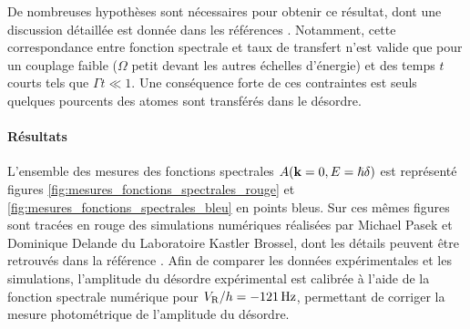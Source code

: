 De nombreuses hypothèses sont nécessaires pour obtenir ce résultat, dont une discussion détaillée est donnée dans les références \citep{denechaud2018vers}\citep{volchkov2018measurement}. Notamment, cette correspondance entre fonction spectrale et taux de transfert n'est valide que pour un couplage faible ($\Omega$ petit devant les autres échelles d'énergie) et des temps $t$ courts tels que $\Gamma t \ll 1$. Une conséquence forte de ces contraintes est seuls quelques pourcents des atomes sont transférés dans le désordre. 



\paragraph*{Résultats}
L'ensemble des mesures des fonctions spectrales $A(\mathbf{k}=0,E=\hslash\delta)$ est représenté figures \ref{fig:mesures_fonctions_spectrales_rouge} et \ref{fig:mesures_fonctions_spectrales_bleu} en points bleus. Sur ces mêmes figures sont tracées en rouge des simulations numériques réalisées par Michael Pasek et Dominique Delande du Laboratoire Kastler Brossel, dont les détails peuvent être retrouvés dans la référence \citep{volchkov2018measurement}. Afin de comparer les données expérimentales et les simulations, l'amplitude du désordre expérimental est calibrée à l'aide de la fonction spectrale numérique pour $V_{\mathrm{R}}/h=\SI{-121}{\hertz}$, permettant de corriger la mesure photométrique de l'amplitude du désordre. 

